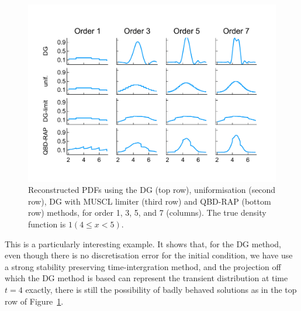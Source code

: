 \begin{example}
\begin{figure}
	\includegraphics[width=\textwidth]{chapter6/figs/wave/fun4/pdfs_formatted.pdf}
	\caption{Reconstructed PDFs using the DG (top row), uniformisation (second row), DG with MUSCL limiter (third row) and QBD-RAP (bottom row) methods, for order 1, 3, 5, and 7 (columns). The true density function is \(1(4\leq x<5)\).}
	\label{fig: pdf wave fun 4}
\end{figure} 

This is a particularly interesting example. It shows that, for the DG method, even though there is no discretisation error for the initial condition, we have use a strong stability preserving time-intergration method, and the projection off which the DG method is based can represent the transient distribution at time \(t=4\) exactly, there is still the possibility of badly behaved solutions as in the top row of Figure~\ref{fig: pdf wave fun 4}. 
\end{example}

